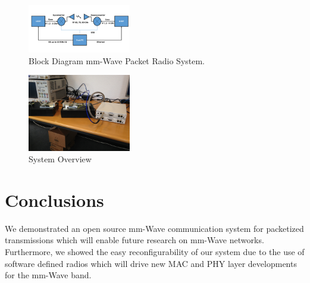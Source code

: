 \documentclass{acm_proc_article-sp}
\begin{document}
\begin{figure}
\center
\includegraphics[width=0.4\textwidth]{block-diagram}
\caption{Block Diagram mm-Wave Packet Radio System.}
\label{fig:block}
\end{figure}

\begin{figure}
\center
\includegraphics[width=0.4\textwidth]{system.jpg}
\caption{System Overview}
\label{fig:system}
\end{figure}
\balancecolumns
\section{Conclusions}
We demonstrated an open source mm-Wave communication system for packetized transmissions which will enable future research on mm-Wave networks. Furthermore, we showed the easy reconfigurability of our system due to the use of software defined radios which will drive new MAC and PHY layer developments for the mm-Wave band.




\balancecolumns
\end{document}

